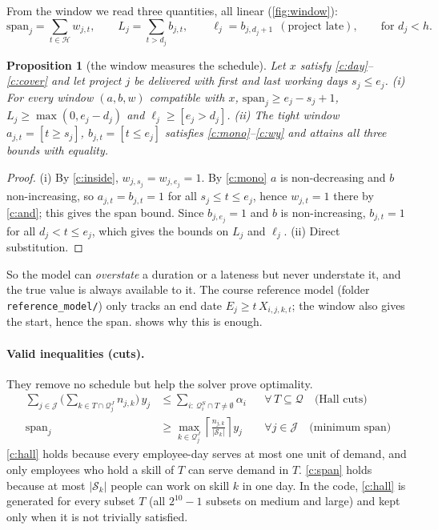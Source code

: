 \documentclass[10pt,a4paper]{article}
\theoremstyle{plain}
\newtheorem{proposition}{Proposition}
\theoremstyle{definition}
\theoremstyle{remark}
\newcommand{\Hor}{\mathcal{H}}
\newcommand{\Q}{\mathcal{Q}}
\newcommand{\Sset}{\mathcal{S}}
\newcommand{\J}{\mathcal{J}}
\newcommand{\QS}[1]{\mathcal{Q}^{S}_{#1}}
\newcommand{\QJ}[1]{\mathcal{Q}^{J}_{#1}}
\newcommand{\avail}[1]{\alpha_{#1}}
\begin{document}
From the window we read three quantities, all linear (\cref{fig:window}):
\begin{equation}
\mathrm{span}_j=\sum_{t\in\Hor} w_{j,t},\qquad
L_j=\sum_{t>d_j} b_{j,t},\qquad
\ell_j = b_{j,d_j+1}\ \ (\text{project late}),\qquad \text{for } d_j<h .
\label{eq:derived}
\end{equation}

\begin{proposition}[the window measures the schedule]\label{prop:window}
Let $x$ satisfy \eqref{c:day}--\eqref{c:cover} and let project $j$ be delivered with first and last
working days $s_j\le e_j$. (i) For every window $(a,b,w)$ compatible with $x$,
$\mathrm{span}_j\ge e_j-s_j+1$, $L_j\ge \max(0,e_j-d_j)$ and $\ell_j\ge[e_j>d_j]$. (ii) The
\emph{tight} window $a_{j,t}=[t\ge s_j]$, $b_{j,t}=[t\le e_j]$ satisfies
\eqref{c:mono}--\eqref{c:wy} and attains all three bounds with equality.
\end{proposition}
\begin{proof}
(i) By \eqref{c:inside}, $w_{j,s_j}=w_{j,e_j}=1$. By \eqref{c:mono} $a$ is non-decreasing and $b$
non-increasing, so $a_{j,t}=b_{j,t}=1$ for all $s_j\le t\le e_j$, hence $w_{j,t}=1$ there by
\eqref{c:and}; this gives the span bound. Since $b_{j,e_j}=1$ and $b$ is non-increasing,
$b_{j,t}=1$ for all $d_j<t\le e_j$, which gives the bounds on $L_j$ and $\ell_j$.
(ii) Direct substitution.
\end{proof}

So the model can \emph{overstate} a duration or a lateness but never understate it, and the true
value is always available to it. The course reference model (folder \texttt{reference\_model/})
only tracks an end date $E_j\ge t\,X_{i,j,k,t}$; the window also gives the start, hence the span.  shows why this is enough.

\paragraph{Valid inequalities (cuts).}
They remove no schedule but help the solver prove optimality.
\begin{align}
\sum_{j\in\J} \Big(\sum_{k\in T\cap\QJ{j}} n_{j,k}\Big)\, y_j &\le \sum_{i:\ \QS{i}\cap T\neq\emptyset} \avail{i}
  && \forall\, T\subseteq \Q \quad\text{(Hall cuts)} \label{c:hall}\\
\mathrm{span}_j &\ge \max_{k\in\QJ{j}} \left\lceil \frac{n_{j,k}}{|\Sset_k|}\right\rceil y_j
  && \forall j\in\J \quad\text{(minimum span)} \label{c:span}
\end{align}
\eqref{c:hall} holds because every employee-day serves at most one unit of demand, and only
employees who hold a skill of $T$ can serve demand in $T$. \eqref{c:span} holds because at most
$|\Sset_k|$ people can work on skill $k$ in one day. In the code, \eqref{c:hall} is generated for
every subset $T$ (all $2^{10}-1$ subsets on medium and large) and kept only when it is not
trivially satisfied.
\end{document}
